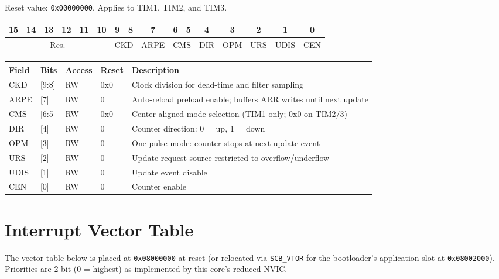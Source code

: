 \documentclass[11pt,a4paper,parskip=half]{scrartcl}
\begin{document}
Reset value: \texttt{0x00000000}. Applies to TIM1, TIM2, and TIM3.

\begin{center}
\small
\begin{tabular}{|*{16}{c|}}
\hline
15 & 14 & 13 & 12 & 11 & 10 & 9 & 8 & 7 & 6 & 5 & 4 & 3 & 2 & 1 & 0 \\
\hline
\multicolumn{6}{c|}{Res.} & \multicolumn{2}{c|}{CKD} & ARPE & \multicolumn{2}{c|}{CMS} & DIR & OPM & URS & UDIS & CEN \\
\hline
\end{tabular}
\end{center}

\begin{center}
\begin{tabularx}{\textwidth}{@{}l l l l Y@{}}
\toprule
\textbf{Field} & \textbf{Bits} & \textbf{Access} & \textbf{Reset} & \textbf{Description} \\
\midrule
CKD & [9:8] & RW & 0x0 & Clock division for dead-time and filter sampling \\
ARPE & [7] & RW & 0 & Auto-reload preload enable; buffers ARR writes until next update \\
CMS & [6:5] & RW & 0x0 & Center-aligned mode selection (TIM1 only; 0x0 on TIM2/3) \\
DIR & [4] & RW & 0 & Counter direction: 0 = up, 1 = down \\
OPM & [3] & RW & 0 & One-pulse mode: counter stops at next update event \\
URS & [2] & RW & 0 & Update request source restricted to overflow/underflow \\
UDIS & [1] & RW & 0 & Update event disable \\
CEN & [0] & RW & 0 & Counter enable \\
\bottomrule
\end{tabularx}
\end{center}

\newpage

\section{Interrupt Vector Table}

The vector table below is placed at \texttt{0x08000000} at reset (or
relocated via \texttt{SCB\_VTOR} for the bootloader's application slot at
\texttt{0x08002000}). Priorities are 2-bit (0 = highest) as implemented by
this core's reduced NVIC.
\end{document}
